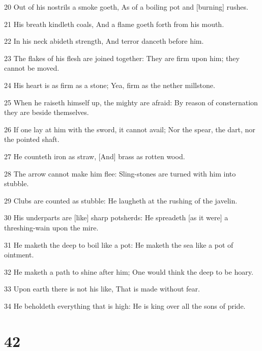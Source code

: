 \par 20 Out of his nostrils a smoke goeth, As of a boiling pot and [burning] rushes.
\par 21 His breath kindleth coals, And a flame goeth forth from his mouth.
\par 22 In his neck abideth strength, And terror danceth before him.
\par 23 The flakes of his flesh are joined together: They are firm upon him; they cannot be moved.
\par 24 His heart is as firm as a stone; Yea, firm as the nether millstone.
\par 25 When he raiseth himself up, the mighty are afraid: By reason of consternation they are beside themselves.
\par 26 If one lay at him with the sword, it cannot avail; Nor the spear, the dart, nor the pointed shaft.
\par 27 He counteth iron as straw, [And] brass as rotten wood.
\par 28 The arrow cannot make him flee: Sling-stones are turned with him into stubble.
\par 29 Clubs are counted as stubble: He laugheth at the rushing of the javelin.
\par 30 His underparts are [like] sharp potsherds: He spreadeth [as it were] a threshing-wain upon the mire.
\par 31 He maketh the deep to boil like a pot: He maketh the sea like a pot of ointment.
\par 32 He maketh a path to shine after him; One would think the deep to be hoary.
\par 33 Upon earth there is not his like, That is made without fear.
\par 34 He beholdeth everything that is high: He is king over all the sons of pride.

\chapter{42}

